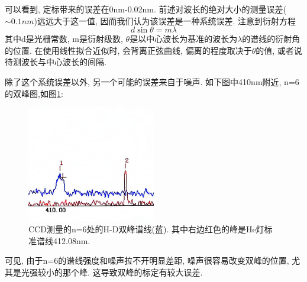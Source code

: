 \documentclass[12pt,a4paper]{article}
\begin{document}
可以看到, 定标带来的误差在0nm-0.02nm. 前述对波长的绝对大小的测量误差($\sim 0.1nm$)远远大于这一值, 因而我们认为该误差是一种系统误差. 
注意到衍射方程
\begin{equation}
    d\sin{\theta}=m \lambda
\end{equation}
其中d是光栅常数, m是衍射级数, $\theta$是以中心波长为基准的波长为$\lambda$的谱线的衍射角的位置. 
在使用线性拟合近似时, 会背离正弦曲线, 偏离的程度取决于$\theta$的值, 或者说待测波长与中心波长的间隔. 

除了这个系统误差以外, 另一个可能的误差来自于噪声. 如下图中410nm附近, n=6的双峰图,如图\ref{fig1}: 
\begin{figure}[H]
    \centering
    \includegraphics[width=0.5\textwidth]{CCD 410.jpg}
    \caption{CCD测量的n=6处的H-D双峰谱线(蓝). 其中右边红色的峰是He灯标准谱线412.08nm. }
    \label{fig1}
\end{figure}
可见, 由于n=6的谱线强度和噪声拉不开明显差距, 噪声很容易改变双峰的位置, 尤其是光强较小的那个峰. 这导致双峰的标定有较大误差.
\end{document}
